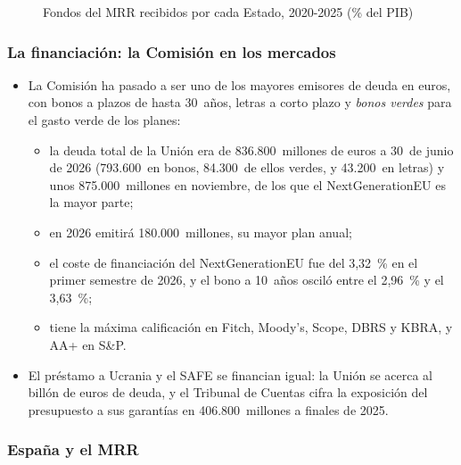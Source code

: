\documentclass[11pt]{article}
\begin{document}
\begin{figure}[H]
\centering
\caption{Fondos del MRR recibidos por cada Estado, 2020-2025 (\% del PIB)}\label{fig:mrr}
\end{figure}

\subsubsection{La financiación: la Comisión en los mercados}\label{sec:financiacion}

\begin{itemize}
\item La Comisión ha pasado a ser uno de los mayores emisores de deuda en euros, con bonos a plazos de hasta 30~años, letras a corto plazo y \emph{bonos verdes} para el gasto verde de los planes\nocite{CE2026Emisor}:
  \begin{itemize}
  \item la deuda total de la Unión era de 836.800~millones de euros a 30~de junio de 2026 (793.600~en bonos, 84.300~de ellos verdes, y 43.200~en letras) y unos 875.000~millones en noviembre, de los que el NextGenerationEU es la mayor parte;
  \item en 2026 emitirá 180.000~millones, su mayor plan anual;
  \item el coste de financiación del NextGenerationEU fue del 3,32~\% en el primer semestre de 2026, y el bono a 10~años osciló entre el 2,96~\% y el 3,63~\%;
  \item tiene la máxima calificación en Fitch, Moody's, Scope, DBRS y KBRA, y AA+ en S\&P.
  \end{itemize}
\item El préstamo a Ucrania y el SAFE se financian igual: la Unión se acerca al billón de euros de deuda, y el Tribunal de Cuentas cifra la exposición del presupuesto a sus garantías en 406.800~millones a finales de 2025\nocite{TCE2026InformeAnual}.
\end{itemize}

\subsubsection{España y el MRR}\label{sec:espana-mrr}
\end{document}
